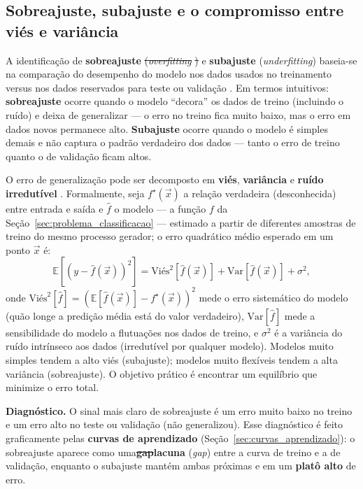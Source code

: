 \documentclass[msc]{on} %
\makeatletter
\providecommand{\DIFaddtex}[1]{{\protect\color{red}#1}} %
\providecommand{\DIFdeltex}[1]{{\protect\color{red}\sout{#1}}} %
\providecommand{\DIFaddbegin}{} %
\providecommand{\DIFaddend}{} %
\providecommand{\DIFdelbegin}{} %
\providecommand{\DIFdelend}{} %
\providecommand{\DIFadd}[1]{\texorpdfstring{\DIFaddtex{#1}}{#1}} %
\providecommand{\DIFdel}[1]{\texorpdfstring{\DIFdeltex{#1}}{}} %
\let\sout@orig\sout %
\renewcommand{\sout}[1]{\ifmmode\text{\sout@orig{\ensuremath{#1}}}\else\sout@orig{#1}\fi} %
\makeatother
\begin{document}
\subsection{\DIFdelbegin %
\DIFdelend\ifhmode\hskip0pt\fi \DIFaddbegin \DIFadd{Sobreajuste, subajuste }\DIFaddend e o compromisso entre viés e variância}
\label{sec:overfitting}

A identificação de \textbf{sobreajuste} \DIFdelbegin \DIFdel{(}\textit{\DIFdel{overfitting}}%
\DIFdel{) }\DIFdelend e \textbf{subajuste} (\textit{underfitting}) baseia-se na comparação do desempenho do modelo nos dados usados no treinamento versus nos dados reservados para teste ou validação \citep{geron2019maos}. Em termos intuitivos: \textbf{sobreajuste} ocorre quando o modelo ``decora'' os dados de treino (incluindo o ruído) e deixa de generalizar --- o erro no treino fica muito baixo, mas o erro em dados novos permanece alto. \textbf{Subajuste} ocorre quando o modelo é simples demais e não captura o padrão verdadeiro dos dados --- tanto o erro de treino quanto o de validação ficam altos. 

O erro de generalização pode ser decomposto em \textbf{viés}, \textbf{variância} e \textbf{ruído irredutível} \citep{Deisenroth2019, Levada2026}. Formalmente, seja $f^\star(\vec{x})$ a relação verdadeira (desconhecida) entre entrada e saída e $\hat{f}$ o modelo --- a função $f$ da Seção~\ref{sec:problema_classificacao} --- estimado a partir de diferentes amostras de treino do mesmo processo gerador; o erro quadrático médio esperado em um ponto $\vec{x}$ é:
\begin{equation}
\mathbb{E}\!\left[(y - \hat{f}(\vec{x}))^2\right] = \text{Viés}^2[\hat{f}(\vec{x})] + \text{Var}[\hat{f}(\vec{x})] + \sigma^2,
\label{eq:bias_variance}
\end{equation}
onde $\text{Viés}^2[\hat{f}] = \left(\mathbb{E}[\hat{f}(\vec{x})] - f^\star(\vec{x})\right)^2$ mede o erro sistemático do modelo (quão longe a predição média está do valor verdadeiro), $\text{Var}[\hat{f}]$ mede a sensibilidade do modelo a flutuações nos dados de treino, e $\sigma^2$ é a variância do ruído intrínseco aos dados (irredutível por qualquer modelo). Modelos muito simples tendem a alto viés (subajuste); modelos muito flexíveis tendem a alta variância (sobreajuste). O objetivo prático é encontrar um equilíbrio que minimize o erro total.

\textbf{Diagnóstico.} O sinal mais claro de sobreajuste é um erro muito baixo no treino e um erro alto no teste ou validação (não generalizou). Esse diagnóstico é feito graficamente pelas \textbf{curvas de aprendizado} (Seção~\ref{sec:curvas_aprendizado}): o sobreajuste aparece como um\DIFaddbegin \DIFadd{a}\DIFaddend  \textbf{\DIFdelbegin \DIFdel{gap}\DIFdelend\ifhmode\hskip0pt\fi \DIFaddbegin \DIFadd{lacuna}\DIFaddend } \DIFaddbegin \DIFadd{(}\textit{\DIFadd{gap}}\DIFadd{) }\DIFaddend entre a curva de treino e a de validação, enquanto o subajuste mantém ambas próximas e em um \textbf{platô alto} de erro.
\end{document}
